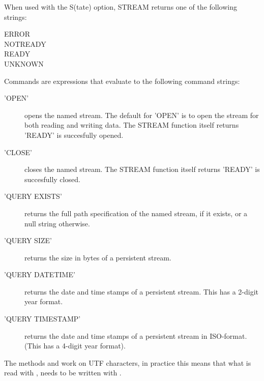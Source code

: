 \begin{description}
When used with the S(tate) option, STREAM
returns one of the following strings:
\begin{description}
\item[ERROR]
\item[NOTREADY]
\item[READY]
\item[UNKNOWN]
\end{description}

Commands are expressions that evaluate to the following command
strings:
\begin{description}
  \item['OPEN'] opens the named stream. The default for 'OPEN' is to
    open the stream for both reading and writing data. The STREAM function itself
    returns 'READY' is succesfully opened.
  \item['CLOSE'] closes the named stream. The STREAM function itself
    returns 'READY' is succesfully closed.
  \item['QUERY EXISTS'] returns the full path specification of the
    named stream, if it exists, or a null string otherwise.
  \item['QUERY SIZE'] returns the size in bytes of a persistent
    stream.
  \item['QUERY DATETIME'] returns the date and time stamps of a
    persistent stream. This has a 2-digit year format.
  \item['QUERY TIMESTAMP'] returns the date and time stamps of a
    persistent stream in ISO-format. (This has a 4-digit year format).
  \end{description}
\end{description}

The methods  and  work on UTF
characters, in practice this means that what is read with
, needs to be written with .


